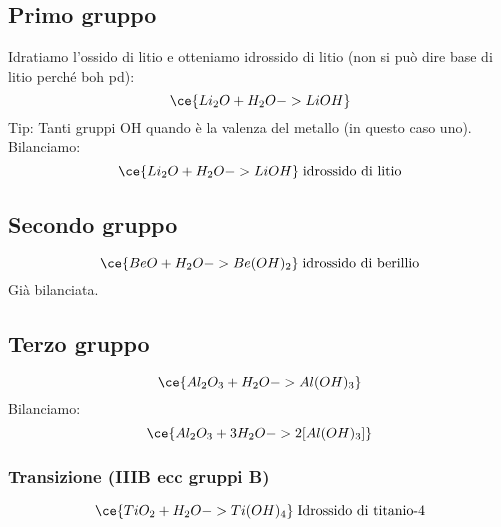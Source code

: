 \subsection{Primo gruppo}
Idratiamo l'ossido di litio e otteniamo idrossido di litio (non si può dire base di litio perché boh pd):
$$\ce{Li_2O + H_2O -> LiOH}$$
Tip: Tanti gruppi OH quando è la valenza del metallo (in questo caso uno). Bilanciamo:
$$\ce{Li_2O + H_2O -> LiOH} \; \text{idrossido di litio}$$
\subsection{Secondo gruppo}
$$\ce{BeO + H_2O -> Be(OH)_2} \; \text{idrossido di berillio}$$
Già bilanciata.
\subsection{Terzo gruppo}
$$\ce{Al_2O_3 + H_2O -> Al(OH)_3}$$
Bilanciamo:
$$\ce{Al_2O_3 + 3 H_2O -> 2 [Al(OH)_3]}$$
\subsubsection{Transizione (IIIB ecc gruppi B)}
$$\ce{TiO_2 + H_2O -> Ti(OH)_4} \; \text{Idrossido di titanio-4}$$